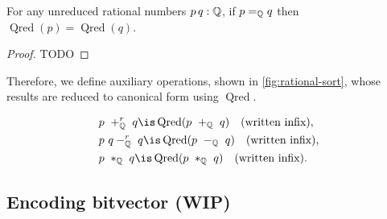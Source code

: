 \begin{lemma}
For any unreduced rational numbers $p\,q: \mathbb{Q}$, if $p =_{\mathbb{Q}} q$ then $\operatorname{Qred}(p) = \operatorname{Qred}(q)$. 
\begin{proof}
TODO
\end{proof}
\end{lemma}

Therefore, we define auxiliary operations, shown in \cref{fig:rational-sort}, whose results are reduced to canonical form using $\operatorname{Qred}$.

\begin{align*}
& p~+^r_\Q~q \is \operatorname{Qred}(p~+_\Q~q) \quad \text{(written infix)}, \\
& p~q-^r_\Q~q \is \operatorname{Qred}(p~-_\Q~q) \quad \text{(written infix)}, \\
& p~*_\Q~q \is \operatorname{Qred}(p~*_\Q~q) \quad \text{(written infix)}.
\end{align*}


\subsection{Encoding bitvector (WIP)}
\label{ssec:encoding-bv}

